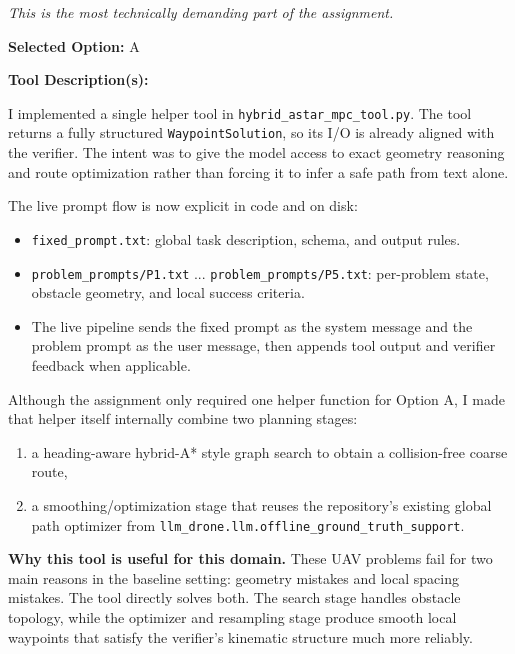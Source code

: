 \documentclass[12pt]{article}
\begin{document}
\textit{This is the most technically demanding part of the assignment.}

\medskip
\textbf{Selected Option:} A

\medskip
\textbf{Tool Description(s):}

\medskip
\noindent
I implemented a single helper tool in \texttt{hybrid\_astar\_mpc\_tool.py}. The tool returns a
fully structured \texttt{WaypointSolution}, so its I/O is already aligned with the verifier. The
intent was to give the model access to exact geometry reasoning and route optimization rather than
forcing it to infer a safe path from text alone.

\medskip
\noindent
The live prompt flow is now explicit in code and on disk:
\begin{itemize}[leftmargin=1.2em]
  \item \texttt{fixed\_prompt.txt}: global task description, schema, and output rules.
  \item \texttt{problem\_prompts/P1.txt} ... \texttt{problem\_prompts/P5.txt}: per-problem state,
  obstacle geometry, and local success criteria.
  \item The live pipeline sends the fixed prompt as the system message and the problem prompt as the
  user message, then appends tool output and verifier feedback when applicable.
\end{itemize}

\medskip
\noindent
Although the assignment only required one helper function for Option A, I made that helper itself
internally combine two planning stages:
\begin{enumerate}[leftmargin=1.4em]
  \item a heading-aware hybrid-A* style graph search to obtain a collision-free coarse route,
  \item a smoothing/optimization stage that reuses the repository's existing global path optimizer
  from \texttt{llm\_drone.llm.offline\_ground\_truth\_support}.
\end{enumerate}

\noindent\textbf{Why this tool is useful for this domain.}
These UAV problems fail for two main reasons in the baseline setting: geometry mistakes and local
spacing mistakes. The tool directly solves both. The search stage handles obstacle topology, while
the optimizer and resampling stage produce smooth local waypoints that satisfy the verifier's
kinematic structure much more reliably.
\end{document}
